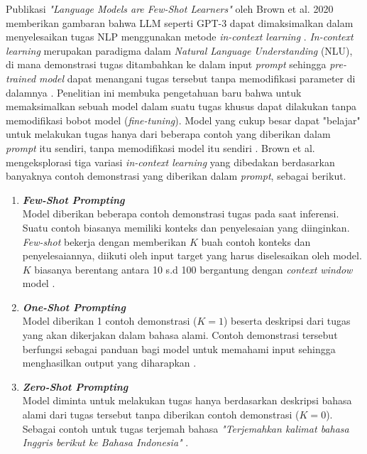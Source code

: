 Publikasi \textit{"Language Models are Few-Shot Learners"} oleh Brown et al. 2020 memberikan gambaran bahwa LLM seperti GPT-3 dapat dimaksimalkan dalam menyelesaikan tugas NLP menggunakan metode \textit{in-context learning} \cite{LLMisFewShot2020}.
\textit{In-context learning} merupakan paradigma dalam \textit{Natural Language Understanding} (NLU), di mana demonstrasi tugas ditambahkan ke dalam input \textit{prompt} sehingga \textit{pre-trained model} dapat menangani tugas tersebut tanpa memodifikasi parameter di dalamnya \cite{Dong2024SurveyInContextLearning}.
Penelitian ini membuka pengetahuan baru bahwa untuk memaksimalkan sebuah model dalam suatu tugas khusus dapat dilakukan tanpa memodifikasi bobot model (\textit{fine-tuning}).
Model yang cukup besar dapat "belajar" untuk melakukan tugas hanya dari beberapa contoh yang diberikan dalam \textit{prompt} itu sendiri, tanpa memodifikasi model itu sendiri \cite{LLMisFewShot2020}.
Brown et al. mengeksplorasi tiga variasi \textit{in-context learning} yang dibedakan berdasarkan banyaknya contoh demonstrasi yang diberikan dalam \textit{prompt}, sebagai berikut.

\begin{enumerate}
	\item \textbf{\textit{Few-Shot Prompting}} \\
	      Model diberikan beberapa contoh demonstrasi tugas pada saat inferensi. Suatu contoh biasanya memiliki konteks dan penyelesaian yang diinginkan.
	      \textit{Few-shot} bekerja dengan memberikan $K$ buah contoh konteks dan penyelesaiannya, diikuti oleh input target yang harus diselesaikan oleh model.
	      $K$ biasanya berentang antara 10 s.d 100 bergantung dengan \textit{context window} model \cite{LLMisFewShot2020}.
	\item \textbf{\textit{One-Shot Prompting}} \\
	      Model diberikan 1 contoh demonstrasi ($K=1$) beserta deskripsi dari tugas yang akan dikerjakan dalam bahasa alami.
	      Contoh demonstrasi tersebut berfungsi sebagai panduan bagi model untuk memahami input sehingga menghasilkan output yang diharapkan \cite{LLMisFewShot2020}.
	\item \textbf{\textit{Zero-Shot Prompting}} \\
	      Model diminta untuk melakukan tugas hanya berdasarkan deskripsi bahasa alami dari tugas tersebut tanpa diberikan contoh demonstrasi ($K = 0$).
	      Sebagai contoh untuk tugas terjemah bahasa \textit{"Terjemahkan kalimat bahasa Inggris berikut ke Bahasa Indonesia"} \cite{LLMisFewShot2020}.
\end{enumerate}

